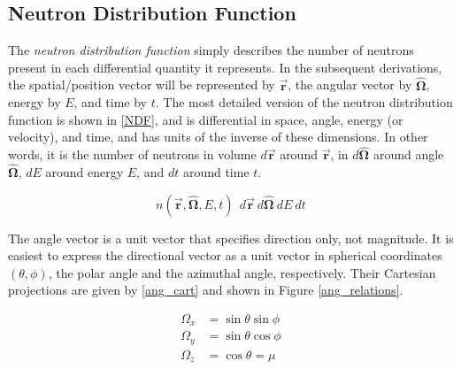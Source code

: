 \subsection{Neutron Distribution Function}

The \emph{neutron distribution function} simply describes the number of neutrons present in each differential quantity it represents.  In the subsequent derivations, the spatial/position vector will be represented by $\boldsymbol{\vec{r}}$, the angular vector by $\boldsymbol{\hat{\Omega}}$, energy by $E$, and time by $t$.   The most detailed version of the neutron distribution function is shown in \eqref{NDF}, and is differential in space, angle, energy (or velocity), and time, and has units of the inverse of these dimensions.  In other words, it is the number of neutrons in volume $d\boldsymbol{\vec{r}}$ around $\boldsymbol{\vec{r}}$, in $d \boldsymbol{\hat{\Omega}}$ around angle $\boldsymbol{\hat{\Omega}}$, $dE$ around energy $E$, and $dt$ around time $t$. 

\begin{equation}
\label{NDF}
n(\boldsymbol{\vec{r}},\boldsymbol{\hat{\Omega}},E,t) \:\: d\boldsymbol{\vec{r}} \: d \boldsymbol{\hat{\Omega}} \: dE \: dt
\end{equation}


The angle vector is a unit vector that specifies direction only, not magnitude.  It is easiest to express the directional vector as a unit vector in spherical coordinates $(\theta, \phi)$, the polar angle and the azimuthal angle, respectively.  Their Cartesian projections are given by \eqref{ang_cart} and shown in Figure \ref{ang_relations}.

\begin{equation}
\label{ang_cart}
\begin{split}
\Omega_x &= \sin \theta \sin \phi  \\
\Omega_y &= \sin \theta \cos \phi \\
\Omega_z &= \cos \theta = \mu
\end{split}
\end{equation}

